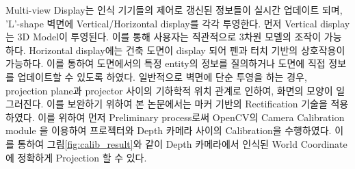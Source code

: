 
Multi-view Display는 인식 기기들의 제어로 갱신된 정보들이 실시간 업데이트 되며, 'L'-shape 벽면에 Vertical/Horizontal display를 각각 투영한다. 먼저 Vertical display는 3D Model이 투영된다. 이를 통해 사용자는 직관적으로 3차원 모델의 조작이 가능하다. Horizontal display에는 건축 도면이 display 되어 펜과 터치 기반의 상호작용이 가능하다. 이를 통하여 도면에서의 특정 entity의 정보를 질의하거나 도면에 직접 정보를 업데이트할 수 있도록 하였다. 일반적으로 벽면에 단순 투영을 하는 경우, projection plane과 projector 사이의 기하학적 위치 관계로 인하여, 화면의 모양이 일그러진다. 이를 보완하기 위하여 본 논문에서는 마커 기반의 Rectification 기술을 적용하였다. 
이를 위하여 먼저 Preliminary process로써 OpenCV의 Camera Calibration module \cite{opencv_2.4.8.0_documentation_camera_????}을 이용하여 프로젝터와 Depth 카메라 사이의 Calibration을 수행하였다. 이를 통하여 그림\ref{fig:calib_result}와 같이 Depth 카메라에서 인식된 World Coordinate에 정확하게 Projection 할 수 있다. 


